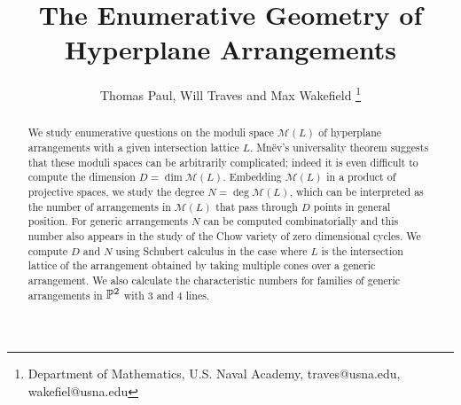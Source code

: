 \documentclass[12pt]{article}
\title{The Enumerative Geometry of Hyperplane Arrangements}
\author{
Thomas Paul, Will Traves and Max Wakefield \thanks{Department of Mathematics, U.S. Naval Academy,
traves@usna.edu, wakefiel@usna.edu}}
\date{}
\theoremstyle{plain}
\theoremstyle{definition}
\newcommand{\M}{\mathcal{M}}
\renewcommand{\P}{\ensuremath \mathbb{P}}
\begin{document}
\maketitle

\begin{abstract}

We study enumerative questions on the moduli space $\M(L)$ of hyperplane arrangements with a given intersection lattice $L$. Mn\"ev's universality theorem suggests that these moduli spaces can be arbitrarily complicated; indeed it is even difficult to compute the dimension $D =\dim \M(L)$. Embedding $\M(L)$ in a product of projective spaces, we study the degree $N=\deg \M(L)$, which can be interpreted as the number of arrangements in $\M(L)$ that pass through $D$ points in general position. For generic arrangements $N$ can be computed combinatorially and this number also appears in the study of the Chow variety of zero dimensional cycles. We compute $D$ and $N$ using Schubert calculus in the case where $L$ is the intersection lattice of the arrangement obtained by taking multiple cones over a generic arrangement. We also calculate the characteristic numbers for families of generic arrangements in $\P^2$ with 3 and 4 lines.

\end{abstract}
\end{document}
